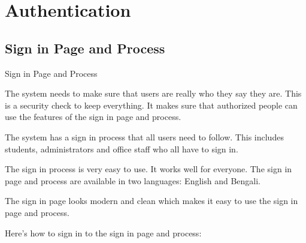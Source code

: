 \section{Authentication}

\subsection{Sign in Page and Process}

\noindent Sign in Page and Process

\vspace{0.3cm}

\noindent The system needs to make sure that users are really who they say they are. This is a security check to keep everything. It makes sure that authorized people can use the features of the sign in page and process.

\vspace{0.3cm}

\noindent The system has a sign in process that all users need to follow. This includes students, administrators and office staff who all have to sign in.

\vspace{0.3cm}

\noindent The sign in process is very easy to use. It works well for everyone. The sign in page and process are available in two languages: English and Bengali.

\vspace{0.3cm}

\noindent The sign in page looks modern and clean which makes it easy to use the sign in page and process.

\vspace{0.3cm}

\noindent Here's how to sign in to the sign in page and process:

